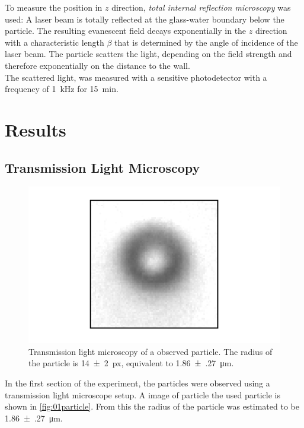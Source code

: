 \documentclass[
    twoside=false,
    twocolumn=true,
    fontsize=11pt,
]{scrarticle}
\begin{document}
To measure the position in $z$ direction, \emph{total internal reflection microscopy} was used:
A laser beam is totally reflected at the glass-water boundary below the particle. 
The resulting evanescent field decays exponentially in the $z$ direction with a characteristic length $\beta$ that is determined by the angle of incidence of the laser beam.
The particle scatters the light, depending on the field strength and therefore exponentially on the distance to the wall.\\
The scattered light, was measured with a sensitive photodetector with a frequency of \SI{1}{kHz} for \SI{15}{min}.

\section{Results}
\subsection{Transmission Light Microscopy}
\begin{figure}
    \centering
    \includegraphics{figures/01_01_1_particle.pdf}
    \caption{Transmission light microscopy of a observed particle. The radius of the particle is \SI{14(2)}{px}, equivalent to \SI{1.86(27)}{\micro m}.}
    \label{fig:01particle}
\end{figure}
In the first section of the experiment, the particles were observed using a transmission light microscope setup.
A image of particle the used particle is shown in \autoref{fig:01particle}.
From this the radius of the particle was estimated to be \SI{1.86(27)}{\micro m}.
\end{document}
